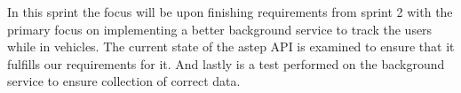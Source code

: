 In this sprint the focus will be upon finishing requirements from  sprint 2 with the primary focus on implementing a better background service to track the users while in vehicles.
The current state of the \gls{astep} API is examined to ensure that it fulfills our requirements for it.
And lastly is a test performed on the background service to ensure collection of correct data.